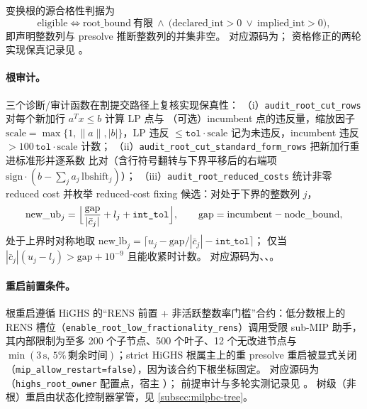 变换根的源合格性判据为
\begin{equation}
  \mathrm{eligible}\iff
  \mathrm{root\_bound}\ \text{有限}\ \land\
  \bigl(\mathrm{declared\_int}>0\ \lor\ \mathrm{implied\_int}>0\bigr),
\end{equation}
即声明整数列与 presolve 推断整数列的并集非空。
对应源码为；
资格修正的两轮实现保真记录见
。

\paragraph{根审计。}
三个诊断/审计函数在割提交路径上复核实现保真性：
（i）\texttt{audit\_root\_cut\_rows} 对每个新加行 $a^Tx\le b$ 计算 LP 点与
（可选）incumbent 点的违反量，缩放因子
$\mathrm{scale}=\max\{1,\|a\|,|b|\}$，LP 违反 $\le \texttt{tol}\cdot\mathrm{scale}$
记为未违反，incumbent 违反 $>100\,\texttt{tol}\cdot\mathrm{scale}$ 计数；
（ii）\texttt{audit\_root\_cut\_standard\_form\_rows} 把新加行重进标准形并逐系数
比对（含行符号翻转与下界平移后的右端项
$\mathrm{sign}\cdot(b-\sum_j a_j\,\mathrm{lbshift}_j)$）；
（iii）\texttt{audit\_root\_reduced\_costs} 统计非零 reduced cost 并枚举
reduced-cost fixing 候选：对处于下界的整数列 $j$，
\begin{equation}
  \mathrm{new\_ub}_j=\Bigl\lfloor \frac{\mathrm{gap}}{|\bar c_j|}
  + l_j + \texttt{int\_tol}\Bigr\rfloor,
  \qquad
  \mathrm{gap}=\mathrm{incumbent}-\mathrm{node\_bound},
\end{equation}
处于上界时对称地取
$\mathrm{new\_lb}_j=\lceil u_j-\mathrm{gap}/|\bar c_j|-\texttt{int\_tol}\rceil$；
仅当 $|\bar c_j|(u_j-l_j)>\mathrm{gap}+10^{-9}$ 且能收紧时计数。
对应源码为、、。

\paragraph{重启前置条件。}
根重启遵循 HiGHS 的``RENS 前置 + 非活跃整数率门槛''合约：低分数根上的 RENS
槽位（\texttt{enable\_root\_low\_fractionality\_rens}）调用受限 sub-MIP 助手，
其内部限制为至多 200 个子节点、500 个叶子、12 个无改进节点与
$\min(3\,\mathrm{s},\,5\%\,\text{剩余时间})$；strict HiGHS 根属主上的重 presolve
重启被显式关闭（\texttt{mip\_allow\_restart=false}），因为该合约下根坐标固定。
对应源码为
（\texttt{highs\_root\_owner} 配置点，宿主
）；
前提审计与多轮实测记录见
。
树级（非根）重启由状态化控制器掌管，见 \ref{subsec:milpbc-tree}。


